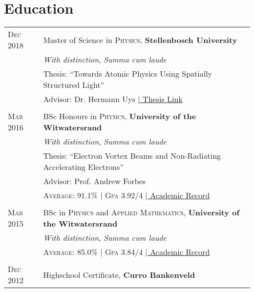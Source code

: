 \section{Education}

\begin{supertabular}{p{1.8cm}|l}
	\textsc{Dec} 2018 & Master of Science in \textsc{Physics}, \textbf{Stellenbosch University}                                                 \\
					  & \small\emph{With distinction}, \emph{Summa cum laude} \\
					  & Thesis: ``Towards Atomic Physics Using Spatially Structured Light''                                                     \\
	                  & \small Advisor: Dr. Hermann Uys \href{https://scholar.sun.ac.za/handle/10019.1/104968}{\hfill| \footnotesize Thesis Link}                                                                                       \\
	 \\
	\textsc{Mar} 2016 & BSc Honours in  \textsc{Physics}, \textbf{University of the Witwatersrand}                                              \\
	                  & \small\emph{With distinction}, \emph{Summa cum laude}                                                                  \\
	                  & Thesis: ``Electron Vortex Beams and Non-Radiating Accelerating Electrons''                                            \\
	                  & \small Advisor: Prof. Andrew Forbes                                                                                     \\
	                  & \normalsize \textsc{Average}: 91.1\% | \textsc{Gpa} 3.92/4 \hyperlink{honours}{\hfill| \footnotesize Academic Record}  \\
	 \\
	\textsc{Mar} 2015 & BSc in \textsc{Physics} and \textsc{Applied Mathematics}, \textbf{University of the Witwatersrand}                      \\
	                  & \small\emph{With distinction}, \emph{Summa cum laude}                                                                  \\
	                  & \normalsize \textsc{Average}: 85.0\% | \textsc{Gpa} 3.84/4 \hyperlink{undergrad}{\hfill| \footnotesize Academic Record} \\
	 \\
	\textsc{Dec} 2012 & Highschool Certificate, \textbf{Curro Bankenveld} \\
\end{supertabular}
